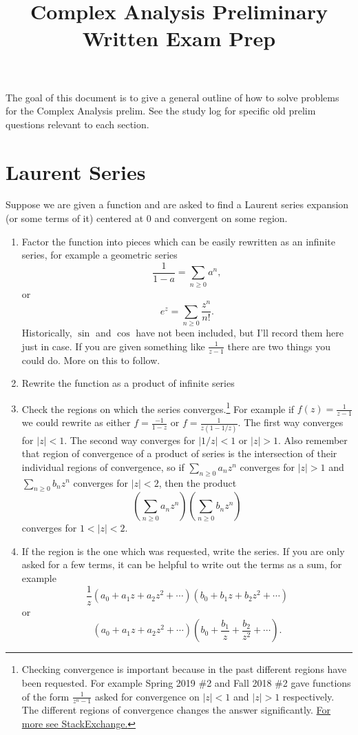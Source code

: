 \documentclass[10pt]{article}
\title{Complex Analysis Preliminary Written Exam Prep}
\begin{document}
\date{}
\maketitle
The goal of this document is to give a general outline of how to solve problems for the Complex Analysis prelim. See the study log for specific old prelim questions relevant to each section.

\section{Laurent Series}

Suppose we are given a function and are asked to find a Laurent series expansion (or some terms of it) centered at $0$ and convergent on some region. 
\begin{enumerate}
	\item Factor the function into pieces which can be easily rewritten as an infinite series, for example a geometric series \[\frac{1}{1- a} = \sum_{n \geq 0} a^n,\] or \[e^z = \sum_{n\geq 0} \frac{z^n}{n!}.\] 
	Historically, $\sin$ and $\cos$ have not been included, but I'll record them here just in case.
	If you are given something like $\frac{1}{z-1}$ there are two things you could do. More on this to follow.
	\item Rewrite the function as a product of infinite series
	\item Check the regions on which the series converges.\footnote{Checking convergence is important because in the past different regions have been requested. For example Spring 2019 \#2 and Fall 2018 \#2 gave functions of the form $\frac{1}{z^n-1}$ asked for convergence on $|z|<1$ and $|z|>1$ respectively. The different regions of convergence changes the answer significantly. \href{https://math.stackexchange.com/questions/2553132/laurent-series-for-different-domains}{For more see StackExchange.}} For example if $f(z) = \frac{1}{z-1}$ we could rewrite as either $f = \frac{-1}{1-z}$ or $f = \frac{1}{z(1-1/z)}$. 
	The first way converges for $|z|<1$. The second way converges for $|1/z|<1$ or $|z|>1$. Also remember that region of convergence of a product of series is the intersection of their individual regions of convergence, so if $\sum_{n\geq 0} a_n z^n$ converges for $|z|>1$ and $\sum_{n \geq 0} b_n z^n$ converges for $|z|<2$, then the product
	\[ \left ( \sum_{n\geq 0} a_n z^n\right) \left ( \sum_{n \geq 0} b_n z^n\right)\]
	converges for $1 < |z| < 2$.
	
	
	
	\item If the region is the one which was requested, write the series. 
	If you are only asked for a few terms, it can be helpful to write out the terms as a sum, for example
	\[\frac{1}{z} (a_0 + a_1 z + a_2 z^2 + \cdots ) (b_0 + b_1 z + b_2 z^2 + \cdots)\]
	or 
	\[(a_0 + a_1 z + a_2 z^2 + \cdots ) (b_0 + \frac{b_1 }{z} + \frac{b_2}{z^2} + \cdots).\]
	

\end{enumerate}
\end{document}
